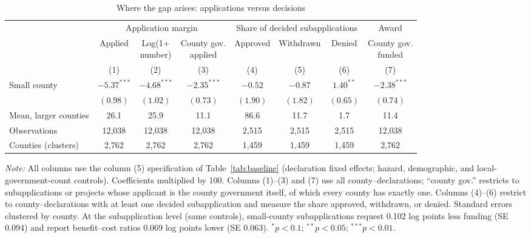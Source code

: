 \begin{table}[!htbp]
\centering
\caption{Where the gap arises: applications versus decisions}
\label{tab:pipeline}
\footnotesize
\begin{adjustbox}{max width=\linewidth}
\begin{tabular}{@{}lccccccc@{}}
\toprule
 & \multicolumn{3}{c}{Application margin} & \multicolumn{3}{c}{Share of decided subapplications} & Award \\
\cmidrule(lr){2-4}\cmidrule(lr){5-7}\cmidrule(lr){8-8}
 & Applied & \shortstack{Log(1+\\number)} & \shortstack{County gov.\\applied} & Approved & Withdrawn & Denied & \shortstack{County gov.\\funded} \\
 & (1) & (2) & (3) & (4) & (5) & (6) & (7) \\
\midrule
Small county & $-5.37^{***}$ & $-4.68^{***}$ & $-2.35^{***}$ & $-0.52$ & $-0.87$ & $1.40^{**}$ & $-2.38^{***}$ \\
 & $(0.98)$ & $(1.02)$ & $(0.73)$ & $(1.90)$ & $(1.82)$ & $(0.65)$ & $(0.74)$ \\
Mean, larger counties & 26.1 & 25.9 & 11.1 & 86.6 & 11.7 & 1.7 & 11.4 \\
Observations & 12,038 & 12,038 & 12,038 & 2,515 & 2,515 & 2,515 & 12,038 \\
Counties (clusters) & 2,762 & 2,762 & 2,762 & 1,459 & 1,459 & 1,459 & 2,762 \\
\bottomrule
\end{tabular}
\end{adjustbox}
\begin{minipage}{0.95\linewidth}\vspace{4pt}\scriptsize
\textit{Note:} All columns use the column (5) specification of Table~\ref{tab:baseline} (declaration fixed effects; hazard, demographic, and local-government-count controls). Coefficients multiplied by 100. Columns (1)--(3) and (7) use all county--declarations; ``county gov.'' restricts to subapplications or projects whose applicant is the county government itself, of which every county has exactly one. Columns (4)--(6) restrict to county--declarations with at least one decided subapplication and measure the share approved, withdrawn, or denied. Standard errors clustered by county. At the subapplication level (same controls), small-county subapplications request 0.102 log points less funding (SE 0.094) and report benefit--cost ratios 0.069 log points lower (SE 0.063). $^{*}p<0.1$; $^{**}p<0.05$; $^{***}p<0.01$.
\end{minipage}
\end{table}
